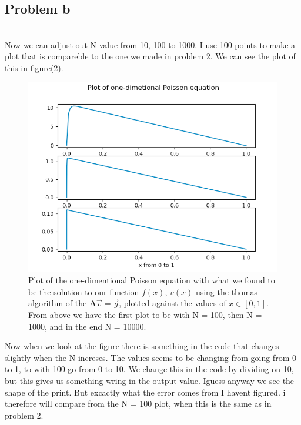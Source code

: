 \documentclass[english,notitlepage]{revtex4-1}  %
\begin{document}
 \subsection*{Problem b}\
 \\
Now we can adjust out N value from 10, 100 to 1000. I use 100 points to make a plot that is compareble to the one we made in problem 2. We can see the plot of this in figure(2).
\begin{figure}%
    \centering %
    \includegraphics[scale=0.55]{v_av_matrise} %
    \caption{Plot of the one-dimentional Poisson equation with what we found to be the solution to our function $f(x)$, $v(x)$ using the thomas algorithm of the $\mathbf{A}\vec{v} = \vec{g}$, plotted against the values of $x \in [0, 1]$. From above we have the first plot to be with N = 100, then N = 1000, and in the end N = 10000.}
    \label{fig:rel_err}
\end{figure}
Now when we look at the figure there is something in the code that changes slightly when the N increses. The values seems to be changing from going from 0 to 1, to with 100 go from 0 to 10. We change this in the code by dividing on 10, but this gives us something wring in the output value. Iguess anyway we see the shape of the print. But excactly what the error comes from I havent figured. i therefore will compare from the N = 100 plot, when this is the same as in problem 2.
\end{document}
